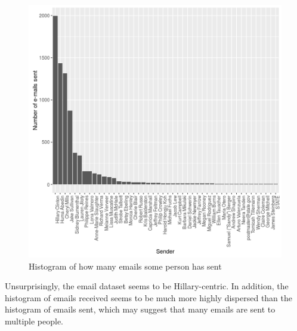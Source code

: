 \begin{figure}[h]
  \centering
  \includegraphics[scale=0.8]{palmer/graphics/num_sent_histogram}
  \caption{Histogram of how many emails some person has sent}
  \label{fig:n_sent_hist}
\end{figure}

Unsurprisingly, the email dataset seems to be Hillary-centric.
In addition, the histogram of emails received seems to be much more highly dispersed than the histogram of emails sent, which may suggest that many emails are sent to multiple people.